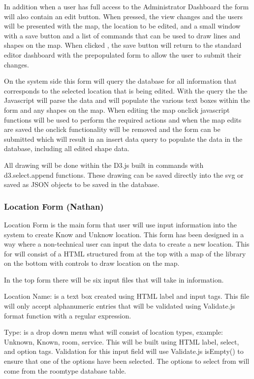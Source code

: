 \documentclass[letterpaper,10pt,titlepage, onecolumn, compsoc]{IEEEtran}
\begin{document}
In addition when a user has full access to the Administrator Dashboard the form will also contain an edit button. When pressed, the view changes and the users will be presented with the map,  the location to be edited, and a small window with a save button and a list of commands that can be used to draw lines and shapes on the map. When clicked , the save button will return to the standard editor dashboard with the prepopulated form to allow the user to submit their changes. 

On the system side this form will query the database for all information that corresponds to the selected location that is being edited. With the query the the Javascript will parse the data and will populate the various text boxes within the form and any shapes on the map. When editing the map onclick javascript functions will be used to perform the required actions and when the map edits are saved the onclick functionality will be removed and the form can be submitted which will result in an insert data query to populate the data in the database, including all edited shape data.

All drawing will be done within the D3.js built in commands with d3.select.append functions. These drawing can be saved directly into the svg or saved as JSON objects to be saved in the database.

\subsubsection{Location Form (Nathan)}
Location Form is the main form that user will use input information into the system to create Know and Unknow location. This form has been designed in a way where a non-technical user can input the data to create a new location. This for will consist of a HTML structured from at the top with a map of the library on the bottom with controls to draw location on the map. 

In the top form there will be six input files that will take in information.  

Location Name: is a text box created using HTML label and input tags. This file will only accept alphanumeric entries that will be validated using Validate.js format function with a regular expression.

Type: is a drop down menu what will consist of location types, example: Unknown, Known, room, service. This will be built using HTML label, select, and option tags. Validation for this input field will use Validate.js isEmpty() to ensure that one of the options have been selected. The options to select from will come from the roomtype database table. 
\end{document}

